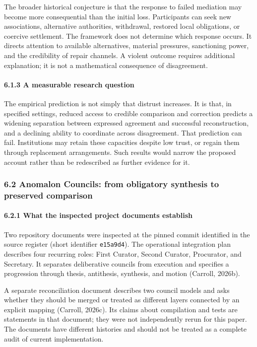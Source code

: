\documentclass[
  10pt,
]{article}
\begin{document}
The broader historical conjecture is that the response to failed mediation may become more consequential than the initial loss. Participants can seek new associations, alternative authorities, withdrawal, restored local obligations, or coercive settlement. The framework does not determine which response occurs. It directs attention to available alternatives, material pressures, sanctioning power, and the credibility of repair channels. A violent outcome requires additional explanation; it is not a mathematical consequence of disagreement.

\paragraph{6.1.3 A measurable research question}\label{a-measurable-research-question}

The empirical prediction is not simply that distrust increases. It is that, in specified settings, reduced access to credible comparison and correction predicts a widening separation between expressed agreement and successful reconstruction, and a declining ability to coordinate across disagreement. That prediction can fail. Institutions may retain these capacities despite low trust, or regain them through replacement arrangements. Such results would narrow the proposed account rather than be redescribed as further evidence for it.

\subsubsection{6.2 Anomalon Councils: from obligatory synthesis to preserved comparison}\label{anomalon-councils-from-obligatory-synthesis-to-preserved-comparison}

\paragraph{6.2.1 What the inspected project documents establish}\label{what-the-inspected-project-documents-establish}

Two repository documents were inspected at the pinned commit identified in the source register (short identifier \texttt{e15a9d4}). The operational integration plan describes four recurring roles: First Curator, Second Curator, Procurator, and Secretary. It separates deliberative councils from execution and specifies a progression through thesis, antithesis, synthesis, and motion (Carroll, 2026b).

A separate reconciliation document describes two council models and asks whether they should be merged or treated as different layers connected by an explicit mapping (Carroll, 2026c). Its claims about compilation and tests are statements in that document; they were not independently rerun for this paper. The documents have different histories and should not be treated as a complete audit of current implementation.
\end{document}
